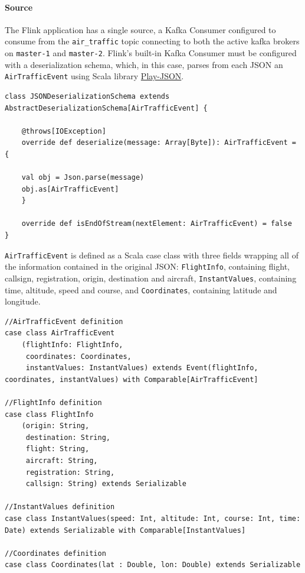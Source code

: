\paragraph{Source}
The Flink application has a single source, a Kafka Consumer configured to consume from the \texttt{air\_traffic} topic connecting to both the active kafka brokers on \texttt{master-1} and \texttt{master-2}. Flink's built-in Kafka Consumer must be configured with a deserialization schema, which, in this case, parses from each JSON an \texttt{AirTrafficEvent} using Scala library \href{https://www.playframework.com/documentation/2.6.x/ScalaJson#The-Play-JSON-library}{Play-JSON}.
\\
\begin{code}
   \begin{verbatim}
class JSONDeserializationSchema extends AbstractDeserializationSchema[AirTrafficEvent] {
       
    @throws[IOException]
    override def deserialize(message: Array[Byte]): AirTrafficEvent = {
       
    val obj = Json.parse(message)
    obj.as[AirTrafficEvent]
    }
       
    override def isEndOfStream(nextElement: AirTrafficEvent) = false
}
   \end{verbatim}
\end{code}

\texttt{AirTrafficEvent} is defined as a Scala case class with three fields wrapping all of the information contained in the original JSON: \texttt{FlightInfo}, containing flight, callsign, registration, origin, destination and aircraft, \texttt{InstantValues}, containing time, altitude, speed and course, and \texttt{Coordinates}, containing latitude and longitude.
\\
\begin{code}
    \begin{verbatim}
//AirTrafficEvent definition
case class AirTrafficEvent
    (flightInfo: FlightInfo,
     coordinates: Coordinates,
     instantValues: InstantValues) extends Event(flightInfo, coordinates, instantValues) with Comparable[AirTrafficEvent]

//FlightInfo definition
case class FlightInfo
    (origin: String,
     destination: String,
     flight: String,
     aircraft: String,
     registration: String,
     callsign: String) extends Serializable

//InstantValues definition
case class InstantValues(speed: Int, altitude: Int, course: Int, time: Date) extends Serializable with Comparable[InstantValues]

//Coordinates definition
case class Coordinates(lat : Double, lon: Double) extends Serializable
    \end{verbatim}
\end{code}

